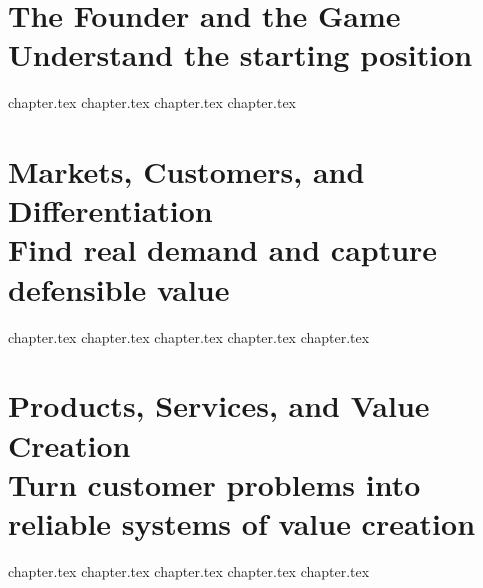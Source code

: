 \documentclass[10pt,twoside,openright]{book}
\let\BookClearDoublePage\cleardoublepage
\renewcommand{\cleardoublepage}{%
  \clearpage
  {\pagestyle{empty}\BookClearDoublePage}%
}
\begin{document}
  \clearpage
  \tableofcontents
  \cleardoublepage

  
  \cleardoublepage

  \mainmatter
  \RaggedRight
  \part[The Founder and the Game]{The Founder and the Game\\[0.4ex]\fontsize{13}{17}\selectfont\mdseries\color{BayesSecondary}Understand the starting position}
  {chapter.tex}
  {chapter.tex}
  {chapter.tex}
  {chapter.tex}

  \part[Markets, Customers, and Differentiation]{Markets, Customers, and Differentiation\\[0.4ex]\fontsize{13}{17}\selectfont\mdseries\color{BayesSecondary}Find real demand and capture defensible value}
  {chapter.tex}
  {chapter.tex}
  {chapter.tex}
  {chapter.tex}
  {chapter.tex}

  \part[Products, Services, and Value Creation]{Products, Services, and Value Creation\\[0.4ex]\fontsize{13}{17}\selectfont\mdseries\color{BayesSecondary}Turn customer problems into reliable systems of value creation}
  {chapter.tex}
  {chapter.tex}
  {chapter.tex}
  {chapter.tex}
  {chapter.tex}
\end{document}
